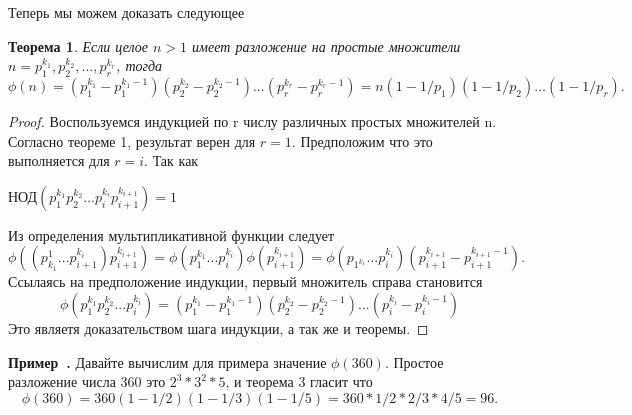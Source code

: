 \documentclass[11pt]{article}
\newtheorem{theorem}{Теорема}
\newcounter{example}[section]
\newenvironment{example}[1][]{\refstepcounter{example}\par\medskip
	\noindent \textbf{Пример~\theexample. #1} \rmfamily}{\medskip}
\begin{document}
\begin{center}
Теперь мы можем доказать следующее
\end{center}
\begin{theorem}
	Если целое $n>1$ имеет разложение на простые множители $n=p_{1}^{k_1},p_{2}^{k_2},... , p_{r}^{k_r}$, тогда
	\[\phi(n) =(p_{1}^{k_1}-p_{1}^{k_{1}-1})(p_{2}^{k_{2}}-p_{2}^{k_{2}-1})...(p_{r}^{k_{r}}-p_{r}^{k_{r}-1})=n(1-1/p_1)(1-1/p_2)...(1-1/p_r).\]
\end{theorem}
\begin{proof}
	Воспользуемся индукцией по r числу различных простых множителей n. Согласно теореме 1, результат верен для $r=1$. Предположим что это выполняется для $r=i$. Так как
\begin{center}
	НОД$(p^{k_1}_{1}p^{k_2}_{2}...p^{k_i}_{i}p^{k_{i+1}}_{i+1})=1$
\end{center}
Из определения мультипликативной функции следует
\[\phi((p_{k_1}^{1}...p^{k_i}_{i+1})p_{i+1}^{k_{i+1}})=\phi(p^{k_1}_{1}...p_{i}^{k_i}) \phi(p_{i+1}^{k_{i+1}})=\phi(p_{1^{k_1}}...p_{i}^{k_{i}})(p_{i+1}^{k_{i+1}}-p_{i+1}^{k_{i+1}-1}).\]
Ссылаясь на предположение индукции, первый множитель справа становится
\[\phi(p_{1}^{k_1}p_{2}^{k_2}...p_{i}^{k_i})=(p_{1}^{k_1}-p_{1}^{k_1-1})(p_{2}^{k_2}-p_{2}^{k_2-1})...
(p_{i}^{k_i}-p_{i}^{k_i-1})\]
Это являетя доказательством шага индукции, а так же и теоремы.
\end{proof}
\begin{example}
	Давайте вычислим для примера значение $\phi(360)$. Простое разложение числа 360 это $2^3*3^2*5$, и теорема 3 гласит что 
	\[\phi(360)=360(1-1/2)(1-1/3)(1-1/5)=360*1/2*2/3*4/5=96.
	\]
\end{example}																					
\end{document}
